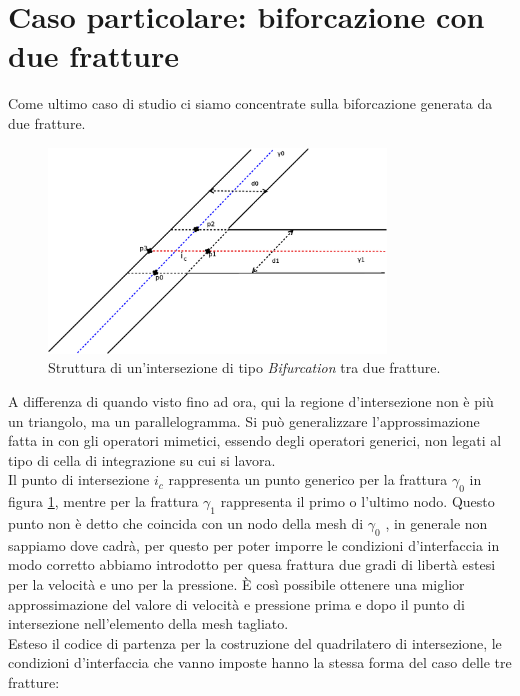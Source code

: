 \section{Caso particolare: biforcazione con due fratture}

Come ultimo caso di studio ci siamo concentrate sulla biforcazione generata da due fratture. 

\begin{figure}[htbp]
\begin{center}
\includegraphics[width=0.8\textwidth]{img/cap6/y.eps}
\caption{Struttura di un'intersezione di tipo \textit{Bifurcation} tra due fratture.}\label{Y}
\end{center}
\end{figure}

A differenza di quando visto fino ad ora, qui la regione d'intersezione non è più un triangolo, ma un parallelogramma. Si può generalizzare l'approssimazione fatta in \cite{Paper} con gli operatori mimetici, essendo degli operatori generici, non legati al tipo di cella di integrazione su cui si lavora. \\
\noindent Il punto di intersezione $i_c$ rappresenta un punto generico per la frattura $\gamma_0$ in figura \ref{Y}, mentre per la frattura $\gamma_1$ rappresenta il primo o l'ultimo nodo. Questo punto non è detto che coincida con un nodo della mesh di $\gamma_0$ , in generale non sappiamo dove cadrà, per questo per poter imporre le condizioni d'interfaccia in modo corretto abbiamo introdotto per quesa frattura due gradi di libertà estesi per la velocità e uno per la pressione. È così possibile ottenere una miglior approssimazione del valore di velocità e pressione prima e dopo il punto di intersezione nell'elemento della mesh tagliato. \\
Esteso il codice di partenza per la costruzione del quadrilatero di intersezione, le condizioni d'interfaccia che vanno imposte hanno la stessa forma del caso delle tre fratture:

